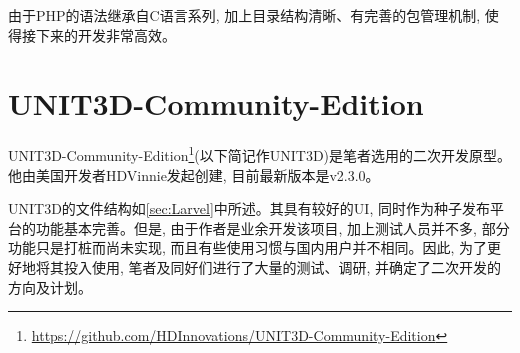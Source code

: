 由于PHP的语法继承自C语言系列, 加上目录结构清晰、有完善的包管理机制, 使得接下来的开发非常高效。


\section{UNIT3D-Community-Edition}

UNIT3D-Community-Edition\footnote{\url{https://github.com/HDInnovations/UNIT3D-Community-Edition}}(以下简记作UNIT3D)是笔者选用的二次开发原型。他由美国开发者HDVinnie发起创建, 目前最新版本是v2.3.0。

UNIT3D的文件结构如\ref{sec:Larvel}中所述。其具有较好的UI, 同时作为种子发布平台的功能基本完善。但是, 由于作者是业余开发该项目, 加上测试人员并不多, 部分功能只是打桩而尚未实现, 而且有些使用习惯与国内用户并不相同。因此, 为了更好地将其投入使用, 笔者及同好们进行了大量的测试、调研, 并确定了二次开发的方向及计划。







% 

